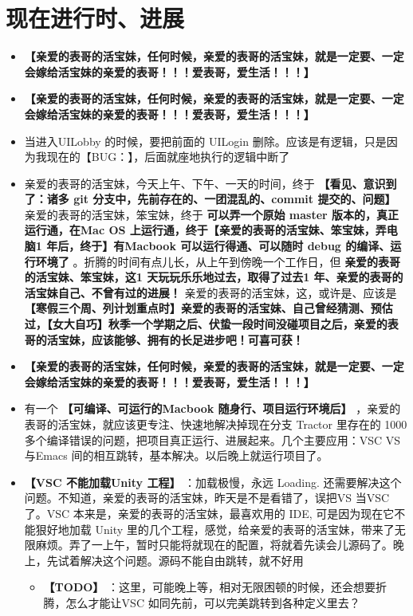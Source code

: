 \documentclass[9pt, b5paper]{article}
\begin{document}
\section{现在进行时、进展}
\label{sec-7}
\begin{itemize}
\item \textbf{【亲爱的表哥的活宝妹，任何时候，亲爱的表哥的活宝妹，就是一定要、一定会嫁给活宝妹的亲爱的表哥！！！爱表哥，爱生活！！！】}
\item \textbf{【亲爱的表哥的活宝妹，任何时候，亲爱的表哥的活宝妹，就是一定要、一定会嫁给活宝妹的亲爱的表哥！！！爱表哥，爱生活！！！】}
\item 当进入UILobby 的时候，要把前面的 UILogin 删除。应该是有逻辑，只是因为我现在的【BUG：】，后面就座地执行的逻辑中断了
\item 亲爱的表哥的活宝妹，今天上午、下午、一天的时间，终于 \textbf{【看见、意识到了：诸多 git 分支中，先前存在的、一团混乱的、commit 提交的、问题】} 亲爱的表哥的活宝妹，笨宝妹，终于 \textbf{可以弄一个原始 master 版本的，真正运行通，在Mac OS 上运行通，终于【亲爱的表哥的活宝妹、笨宝妹，弄电脑1 年后，终于】有Macbook 可以运行得通、可以随时 debug 的编译、运行环境了} 。折腾的时间有点儿长，从上午到傍晚一个工作日，但 \textbf{亲爱的表哥的活宝妹、笨宝妹，这1 天玩玩乐乐地过去，取得了过去1 年、亲爱的表哥的活宝妹自己、不曾有过的进展！} 亲爱的表哥的活宝妹，这，或许是、应该是 \textbf{【寒假三个周、列计划重点时】亲爱的表哥的活宝妹、自己曾经猜测、预估过，【女大自巧】秋季一个学期之后、伏蛰一段时间没碰项目之后，亲爱的表哥的活宝妹，应该能够、拥有的长足进步吧！可喜可获！}
\item \textbf{【亲爱的表哥的活宝妹，任何时候，亲爱的表哥的活宝妹，就是一定要、一定会嫁给活宝妹的亲爱的表哥！！！爱表哥，爱生活！！！】}
\item 有一个 \textbf{【可编译、可运行的Macbook 随身行、项目运行环境后】} ，亲爱的表哥的活宝妹，就应该更专注、快速地解决掉现在分支 Tractor 里存在的 1000 多个编译错误的问题，把项目真正运行、进展起来。几个主要应用：VSC VS 与Emacs 间的相互跳转，基本解决。以后晚上就运行项目了。
\item \textbf{【VSC 不能加载Unity 工程】} ：加载极慢，永远 Loading. 还需要解决这个问题。不知道，亲爱的表哥的活宝妹，昨天是不是看错了，误把VS 当VSC 了。VSC 本来是，亲爱的表哥的活宝妹，最喜欢用的 IDE, 可是因为现在它不能狠好地加载 Unity 里的几个工程，感觉，给亲爱的表哥的活宝妹，带来了无限麻烦。弄了一上午，暂时只能将就现在的配置，将就着先读会儿源码了。晚上，先试着解决这个问题。源码不能自由跳转，就不好用
\begin{itemize}
\item \textbf{【TODO】} ：这里，可能晚上等，相对无限困顿的时候，还会想要折腾，怎么才能让VSC 如同先前，可以完美跳转到各种定义里去？

\end{itemize}
\end{itemize}
\end{document}
